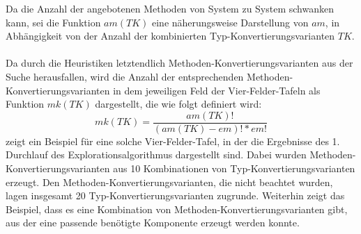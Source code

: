 \noindent
Da die Anzahl der angebotenen Methoden von System zu System schwanken kann, sei die Funktion $am(TK)$ eine näherungsweise Darstellung von $am$, in Abhängigkeit von der Anzahl der kombinierten Typ-Konvertierungsvarianten $TK$.\\\\
Da durch die Heuristiken letztendlich Methoden-Konvertierungsvarianten aus der Suche herausfallen, wird die Anzahl der entsprechenden Methoden-Konvertierungsvarianten in dem jeweiligen Feld der Vier-Felder-Tafeln als Funktion $mk(TK)$ dargestellt, die wie folgt definiert wird:
\begin{equation*}
mk(TK) = \frac{am(TK)!}{(am(TK)-em)!*em!}
\end{equation*}
\noindent
{} zeigt ein Beispiel für eine solche Vier-Felder-Tafel, in der die Ergebnisse des 1. Durchlauf des Explorationsalgorithmus dargestellt sind. Dabei wurden Methoden-Konvertierungsvarianten aus 10 Kombinationen von Typ-Konvertierungsvarianten erzeugt. Den Methoden-Konvertierungsvarianten, die nicht beachtet wurden, lagen insgesamt 20 Typ-Konvertierungsvarianten  zugrunde. Weiterhin zeigt das Beispiel, dass es eine Kombination von Methoden-Konvertierungsvarianten gibt, aus der eine passende benötigte Komponente erzeugt werden konnte.


%
%
